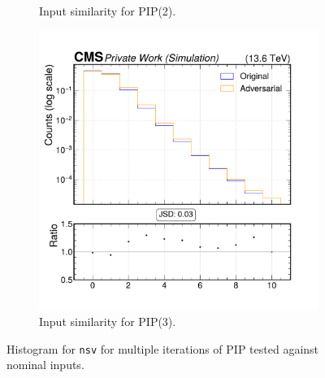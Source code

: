 \begin{figure}[h]
\begin{subfigure}[t]{0.32\textwidth}
    \caption{Input similarity for PIP(2).}
  \end{subfigure}\hfill
  \begin{subfigure}[t]{0.32\textwidth}
    \includegraphics[width=\linewidth]{media/output/features/compare/intprob_3/cmp_global_features_nsv.pdf}
    \caption{Input similarity for PIP(3).}
  \end{subfigure}

  \caption{Histogram for \texttt{nsv} for multiple iterations of PIP tested against nominal inputs.}
  \label{fig:intprob_input_nsv}
\end{figure}
